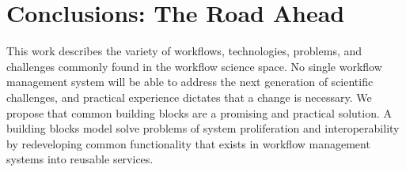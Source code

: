 \section{Conclusions: The Road Ahead}

This work describes the variety of workflows, technologies, problems, and
challenges commonly found in the workflow science space. No
single workflow management system will be able to address the next generation
of scientific challenges, and practical experience dictates that a change is
necessary. We propose  that common building blocks are a promising and
practical solution. A building blocks model solve problems of
system proliferation and interoperability by redeveloping common functionality
that exists in workflow management systems into reusable services.


